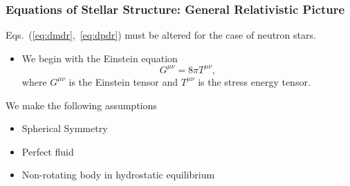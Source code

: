 \documentclass{beamer}
\begin{document}
\begin{frame}
\frametitle{Equations of Stellar Structure: General Relativistic Picture}
Eqs.~(\ref{eq:dmdr},~\ref{eq:dpdr}) must be altered for the case of neutron stars. 
\begin{itemize}
\item We begin with the Einstein equation
\begin{equation}\label{eq:einstein}
G^{\mu\nu} = 8\pi T^{\mu\nu},
\end{equation}
where $G^{\mu\nu}$ is the Einstein tensor and $T^{\mu\nu}$ is the stress energy tensor. 
\end{itemize}

We make the following assumptions
\begin{itemize}
\item Spherical Symmetry
\item Perfect fluid
\item Non-rotating body in hydrostatic equilibrium
\end{itemize} 
\end{frame}

\end{document}
